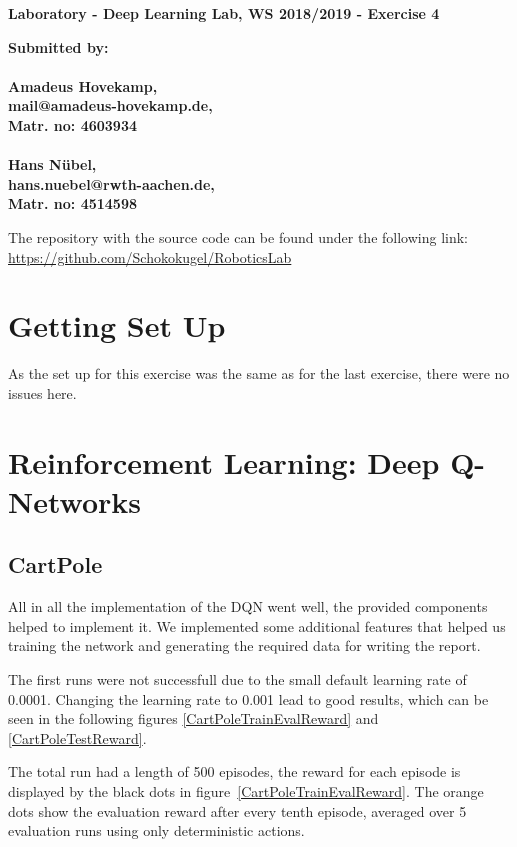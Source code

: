 \documentclass[
        a4paper,
        10pt,
        parskip = full,    %
    ]{scrartcl}
\begin{document}
\textbf{\large{Laboratory - Deep Learning Lab, WS 2018/2019 - Exercise 4}}

\textbf{\large{Submitted by:\\
\\
Amadeus Hovekamp,\\
mail@amadeus-hovekamp.de,\\
Matr. no: 4603934\\
\\
Hans N\"ubel,\\
hans.nuebel@rwth-aachen.de,\\
Matr. no: 4514598}}

The repository with the source code can be found under the following link:\\
\href{https://github.com/Schokokugel/RoboticsLab}
     {https://github.com/Schokokugel/RoboticsLab}


\section{Getting Set Up}

As the set up for this exercise was the same as for the last exercise, there were no issues here.

\section{Reinforcement Learning: Deep Q-Networks}

\subsection{CartPole}

All in all the implementation of the DQN went well, the provided components
helped to implement it. We implemented some additional features that helped us
training the network and generating the required data for writing the report.


The first runs were not successfull due to the small default learning
rate of 0.0001. Changing the learning rate to 0.001 lead to good results,
which can be seen in the following figures \ref{CartPoleTrainEvalReward}
and \ref{CartPoleTestReward}.


The total run had a length of 500 episodes, the reward for each episode is
displayed by the black dots in figure~\ref{CartPoleTrainEvalReward}. The orange dots
show the evaluation reward after every tenth episode, averaged over 5 evaluation
runs using only deterministic actions.
\end{document}
